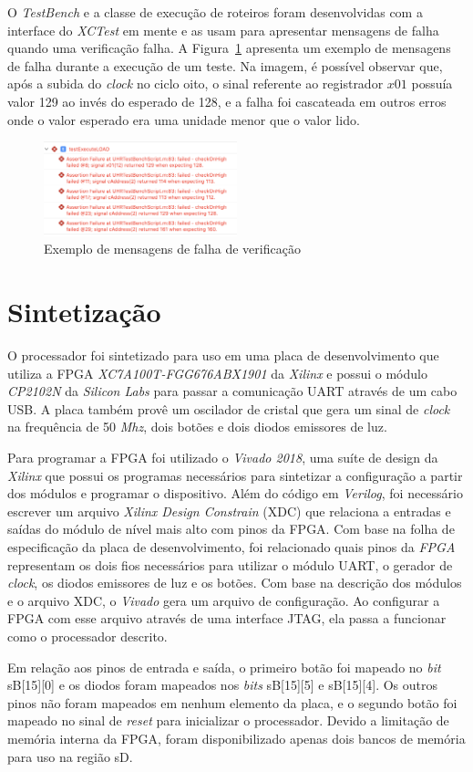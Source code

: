 O \emph{TestBench} e a classe de execução de roteiros foram desenvolvidas com a
interface do \emph{XCTest} em mente e as usam para 
apresentar mensagens de falha quando uma
verificação falha. A Figura~\ref{fig:errmsg} apresenta um exemplo de mensagens de falha
durante a execução de um teste. Na imagem, é possível observar
que, após a subida do \emph{clock} no ciclo oito, o sinal referente ao registrador
$x01$ possuía valor 129 ao invés do esperado de 128, e a falha
foi cascateada em outros erros onde o valor esperado era uma unidade
menor que o valor lido.

\begin{figure}
  \centering
  \includegraphics[width=0.5\textwidth]{img2}
  \caption{Exemplo de mensagens de falha de verificação \label{fig:errmsg}}
\end{figure}

\section{Sintetização}
\label{sec:sin}

O processador foi sintetizado para uso em uma placa de desenvolvimento que
utiliza a FPGA \emph{XC7A100T-FGG676ABX1901} da \emph{Xilinx}
e possui o módulo
\emph{CP2102N} da \emph{Silicon Labs} para passar a comunicação UART
através de um cabo USB. A placa também provê um oscilador de cristal
que gera um sinal de \emph{clock} na frequência de 50 \emph{Mhz}, dois botões
e dois diodos emissores de luz.

Para programar a FPGA foi utilizado o \emph{Vivado 2018}, uma suíte
de design da \emph{Xilinx} que possui os programas necessários para
sintetizar a configuração a partir dos módulos e programar o dispositivo.
Além do código em \emph{Verilog}, foi necessário escrever um arquivo
\emph{Xilinx Design Constrain} (XDC) \citep{XDC} que relaciona a entradas e
saídas do módulo de nível mais alto com pinos da FPGA. Com base na folha 
de especificação da placa de desenvolvimento, foi relacionado
quais pinos da \emph{FPGA} representam os dois fios necessários para utilizar o módulo
UART, o gerador de \emph{clock}, os diodos emissores de luz e os botões.
Com base na descrição dos módulos e o arquivo XDC, o \emph{Vivado} gera um arquivo
de configuração. Ao configurar a FPGA com esse arquivo através de uma interface
JTAG, ela passa a funcionar como o processador descrito.


Em relação aos pinos de entrada e saída, o primeiro botão foi mapeado no \emph{bit} 
sB[15][0] e os diodos foram mapeados nos \emph{bits} sB[15][5] e sB[15][4]. Os outros
pinos não foram mapeados em nenhum elemento da placa, e o segundo botão foi mapeado no sinal
de \emph{reset} para inicializar o processador.
Devido a limitação de memória interna da FPGA, foram disponibilizado 
apenas dois bancos de memória para uso na região sD.